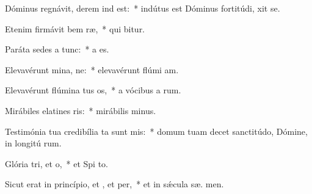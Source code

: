 \item Dóminus regnávit, derem ind est:~* indútus est Dóminus fortitúdi,  xit se.
\item Etenim firmávit bem ræ,~* qui  bitur.
\item Paráta sedes a  tunc:~* a   es.
\item Elevavérunt mina, ne:~* elevavérunt flúmi  am.
\item Elevavérunt flúmina tus os,~* a vócibus a rum.
\item Mirábiles elatines ris:~* mirábilis   minus.
\item Testimónia tua credibília ta sunt mis:~* domum tuam decet sanctitúdo, Dómine, in longitú rum.
\item Glória tri, et o,~* et Spi to.
\item Sicut erat in princípio, et , et per,~* et in sǽcula sæ. men.
